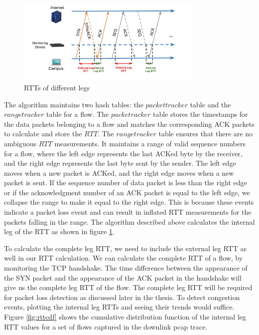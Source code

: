 \begin{figure}[t]
    \centering
        \includegraphics[width=0.8\textwidth]{Figures/rtt.png}
    \caption[RTTs of different legs]{RTTs of different legs ~\cite{dart-sigcomm22}}
    \label{fig:rtt}
    \bigskip
\end{figure}

The algorithm maintains two hash tables: the $packettracker$ table and the $rangetracker$ table for a flow. The $packetracker$ table stores the timestamps for the data packets belonging to a flow and matches the corresponding ACK packets to calculate and store the $RTT$. The $rangetracker$ table ensures that there are no ambiguous $RTT$ measurements. It maintains a range of valid sequence numbers for a flow, where the left edge represents the last ACKed byte by the receiver, and the right edge represents the last byte sent by the sender. The left edge moves when a new packet is ACKed, and the right edge moves when a new packet is sent. If the sequence number of data packet is less than the right edge or if the acknowledgment number of an ACK packet is equal to the left edge, we collapse the range to make it equal to the right edge. This is because these events indicate a packet loss event and can result in inflated RTT measurements for the packets falling in the range. The algorithm described above calculates the internal leg of the RTT as shown in figure \ref{fig:rtt}.

To calculate the complete leg RTT, we need to include the external leg RTT as well in our RTT calculation. We can calculate the complete RTT of a flow, by monitoring the TCP handshake. The time difference between the appearance of the SYN packet and the appearance of the ACK packet in the handshake will give us the complete leg RTT of the flow. The complete leg RTT will be required for packet loss detection as discussed later in the thesis. To detect congestion events, plotting the internal leg RTTs and seeing their trends would suffice. Figure \ref{fig:rttcdf} shows the cumulative distribution function of the internal leg RTT values for a set of flows captured in the downlink pcap trace.


